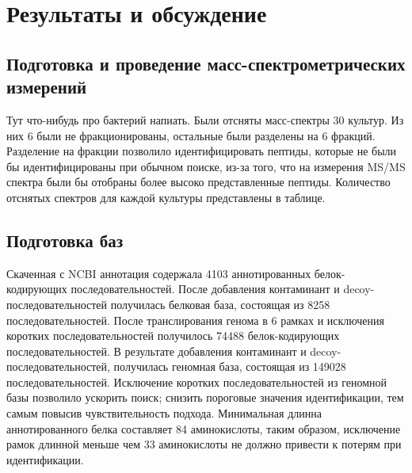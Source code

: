 \section{Результаты и обсуждение}

\subsection{Подготовка и проведение масс-спектрометрических измерений}
Тут что-нибудь про бактерий напиать.
Были отсняты масс-спектры 30 культур. Из них 6 были не фракционированы, остальные были разделены на 6 фракций. Разделение на фракции позволило идентифицировать пептиды, которые не были бы идентифицированы при обычном поиске, из-за того, что на измерения MS/MS спектра были бы отобраны более высоко представленные пептиды. Количество отснятых спектров для каждой культуры представлены в таблице.

\subsection{Подготовка баз}
Скаченная с NCBI аннотация содержала 4103 аннотированных белок-кодирующих последовательностей. После добавления контаминант и decoy-последовательностей получилась белковая база, состоящая из 8258 последовательностей. После транслирования генома в 6 рамках и исключения коротких последовательностей получилось 74488 белок-кодирующих последовательностей. В результате добавления контаминант и decoy-последовательностей, получилась геномная база, состоящая из 149028 последовательностей. Исключение коротких последовательностей из геномной базы позволило ускорить поиск; снизить пороговые значения идентификации, тем самым повысив чувствительность подхода. Минимальная длинна аннотированного белка  составляет 84 аминокислоты, таким образом, исключение рамок длинной меньше чем 33 аминокислоты не должно привести к потерям при идентификации.

